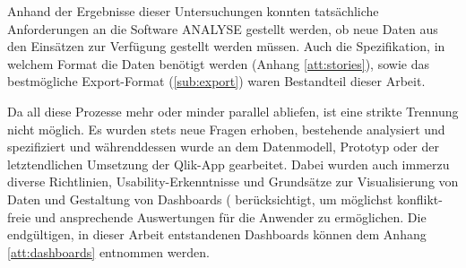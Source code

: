 Anhand der Ergebnisse dieser Untersuchungen konnten tatsächliche Anforderungen an die Software \gls{ANALYSE} gestellt werden, ob neue Daten aus den Einsätzen zur Verfügung gestellt werden müssen.
Auch die Spezifikation, in welchem Format die Daten benötigt werden (Anhang \ref{att:stories}), sowie das bestmögliche Export-Format (\ref{sub:export}) waren Bestandteil dieser Arbeit. 

Da all diese Prozesse mehr oder minder parallel abliefen, ist eine strikte Trennung nicht möglich.
Es wurden stets neue Fragen erhoben, bestehende analysiert und spezifiziert und währenddessen wurde an dem Datenmodell, Prototyp oder der letztendlichen Umsetzung der Qlik-App gearbeitet.
Dabei wurden auch immerzu diverse Richtlinien, Usability-Erkenntnisse und Grundsätze zur Visualisierung von Daten und Gestaltung von Dashboards (\cite{Bassler.2010, Card.2007, Fischer.2014, FischerStabel.2018, Hichert.2017, Kertzel.2018, Mccormick.1987, Schumann.2000, Ware.2009} berücksichtigt, um möglichst konflikt-freie und ansprechende Auswertungen für die Anwender zu ermöglichen.
Die endgültigen, in dieser Arbeit entstandenen Dashboards können dem Anhang \ref{att:dashboards} entnommen werden.


